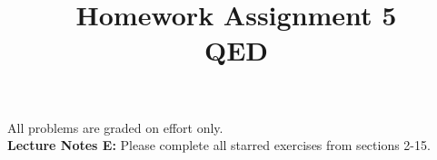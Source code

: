 \documentclass[12pt]{article}
\begin{document}
\date{\vspace{-5ex}}

\title{Homework Assignment 5 \\ QED}

\maketitle

\noindent
All problems are graded on effort only.\\

\noindent
{\bf Lecture Notes E:} Please complete all starred exercises from
sections 2-15.\\
\end{document}
